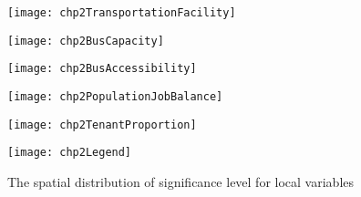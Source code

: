 \begin{figure}[htbp]
	\begin{minipage}{0.48\linewidth}
		\centering
		\texttt{[image: chp2TransportationFacility]} %
	\end{minipage}
	\hfill %
	\begin{minipage}{0.48\linewidth}
		\centering
		\texttt{[image: chp2BusCapacity]}
	\end{minipage}
	
	\vfill %
	
	\begin{minipage}{0.48\linewidth}
		\centering
		\texttt{[image: chp2BusAccessibility]}
	\end{minipage}
	\hfill
	\begin{minipage}{0.48\linewidth}
		\centering
		\texttt{[image: chp2PopulationJobBalance]}
	\end{minipage}
	
	\vfill
	
	\begin{minipage}{0.48\linewidth}
		\centering
		\texttt{[image: chp2TenantProportion]}
	\end{minipage}
	\hfill
	\begin{minipage}[c]{0.48\linewidth}
		\centering
		\texttt{[image: chp2Legend]}\\
	\end{minipage}
	
	\caption{The spatial distribution of significance level for local variables}
	\label{fig:chp2:SignificanceDistribution}
\end{figure}

%
